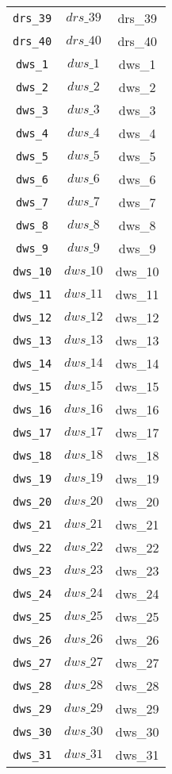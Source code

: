 \begin{center}
\begin{longtable}{ccc}
\texttt{drs\_39} & $drs\_39$ & drs\_39\\
\texttt{drs\_40} & $drs\_40$ & drs\_40\\
\texttt{dws\_1} & $dws\_1$ & dws\_1\\
\texttt{dws\_2} & $dws\_2$ & dws\_2\\
\texttt{dws\_3} & $dws\_3$ & dws\_3\\
\texttt{dws\_4} & $dws\_4$ & dws\_4\\
\texttt{dws\_5} & $dws\_5$ & dws\_5\\
\texttt{dws\_6} & $dws\_6$ & dws\_6\\
\texttt{dws\_7} & $dws\_7$ & dws\_7\\
\texttt{dws\_8} & $dws\_8$ & dws\_8\\
\texttt{dws\_9} & $dws\_9$ & dws\_9\\
\texttt{dws\_10} & $dws\_10$ & dws\_10\\
\texttt{dws\_11} & $dws\_11$ & dws\_11\\
\texttt{dws\_12} & $dws\_12$ & dws\_12\\
\texttt{dws\_13} & $dws\_13$ & dws\_13\\
\texttt{dws\_14} & $dws\_14$ & dws\_14\\
\texttt{dws\_15} & $dws\_15$ & dws\_15\\
\texttt{dws\_16} & $dws\_16$ & dws\_16\\
\texttt{dws\_17} & $dws\_17$ & dws\_17\\
\texttt{dws\_18} & $dws\_18$ & dws\_18\\
\texttt{dws\_19} & $dws\_19$ & dws\_19\\
\texttt{dws\_20} & $dws\_20$ & dws\_20\\
\texttt{dws\_21} & $dws\_21$ & dws\_21\\
\texttt{dws\_22} & $dws\_22$ & dws\_22\\
\texttt{dws\_23} & $dws\_23$ & dws\_23\\
\texttt{dws\_24} & $dws\_24$ & dws\_24\\
\texttt{dws\_25} & $dws\_25$ & dws\_25\\
\texttt{dws\_26} & $dws\_26$ & dws\_26\\
\texttt{dws\_27} & $dws\_27$ & dws\_27\\
\texttt{dws\_28} & $dws\_28$ & dws\_28\\
\texttt{dws\_29} & $dws\_29$ & dws\_29\\
\texttt{dws\_30} & $dws\_30$ & dws\_30\\
\texttt{dws\_31} & $dws\_31$ & dws\_31\\

\end{longtable}
\end{center}
